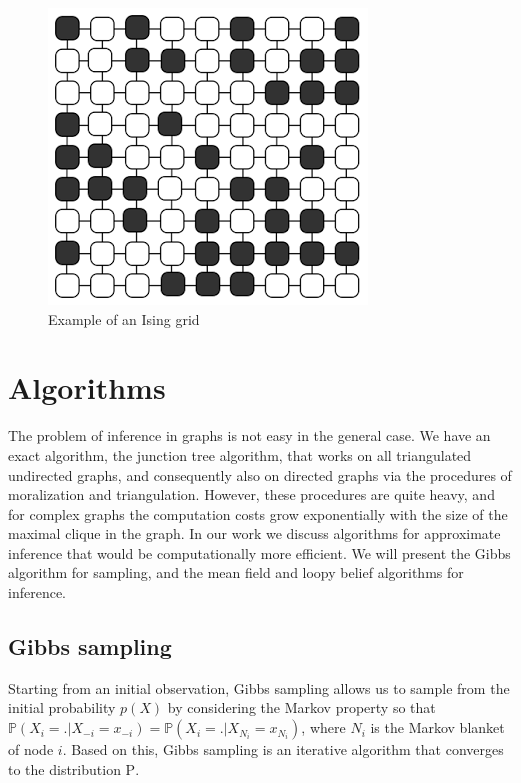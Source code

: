 \documentclass[a4paper]{article}
\begin{document}
\begin{figure}[h]
	\centering
	\includegraphics[scale=0.65]{rgising1}
	\caption{Example of an Ising grid}
    \label{grid}
\end{figure}

\section{Algorithms}

    The problem of inference in graphs is not easy in the general case. We have an exact algorithm, the junction tree algorithm, that works on all triangulated undirected graphs, and consequently also on directed graphs via the procedures of moralization and triangulation. However, these procedures are quite heavy, and for complex graphs the computation costs grow exponentially with the size of the maximal clique in the graph. In our work we discuss algorithms for approximate inference that would be computationally more efficient. We will present the Gibbs algorithm for sampling, and the mean field and loopy belief algorithms for inference.
    
\subsection{Gibbs sampling}
    Starting from an initial observation, Gibbs sampling allows us to sample from the initial probability $p(X)$ by considering the Markov property so that $\mathbb{P}(X_i=.|X_{-i}=x_{-i}) = \mathbb{P}(X_i=.|X_{N_i}=x_{N_i})$, where $N_i$ is the Markov blanket of node $i$. Based on this, Gibbs sampling is an iterative algorithm that converges to the distribution $\mathrm{P}$.
    \paragraph{}
    
\end{document}
